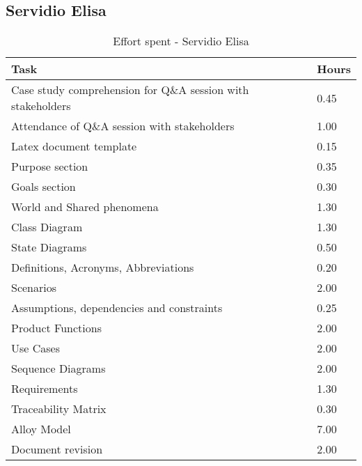 \subsection{Servidio Elisa}
\renewcommand{\arraystretch}{1.8}
\begin{longtable}{|m{9cm}|m{1.2cm}|}
\caption{Effort spent - Servidio Elisa}\\
\hline
\endfirsthead
\endhead
\hline
\endlastfoot
\rowcolor{green2}
\textbf{Task} &\hfil {\textbf{Hours}}\\
\hline
Case study comprehension for Q\&A session with stakeholders & \hfil 0.45\\
Attendance of Q\&A session with stakeholders & \hfil 1.00\\
Latex document template & \hfil 0.15\\
Purpose section	& \hfil 0.35\\
Goals section & \hfil 0.30\\
World and Shared phenomena & \hfil 1.30\\
Class Diagram & \hfil 1.30\\
State Diagrams & \hfil 0.50\\
Definitions, Acronyms, Abbreviations & \hfil 0.20\\
Scenarios & \hfil 2.00\\
Assumptions, dependencies and constraints & \hfil 0.25\\
Product Functions & \hfil 2.00\\
Use Cases & \hfil 2.00\\
Sequence Diagrams & \hfil 2.00\\
Requirements & \hfil 1.30\\
Traceability Matrix & \hfil 0.30\\
Alloy Model & \hfil 7.00\\
Document revision & \hfil 2.00\\
\end{longtable}

\newpage
